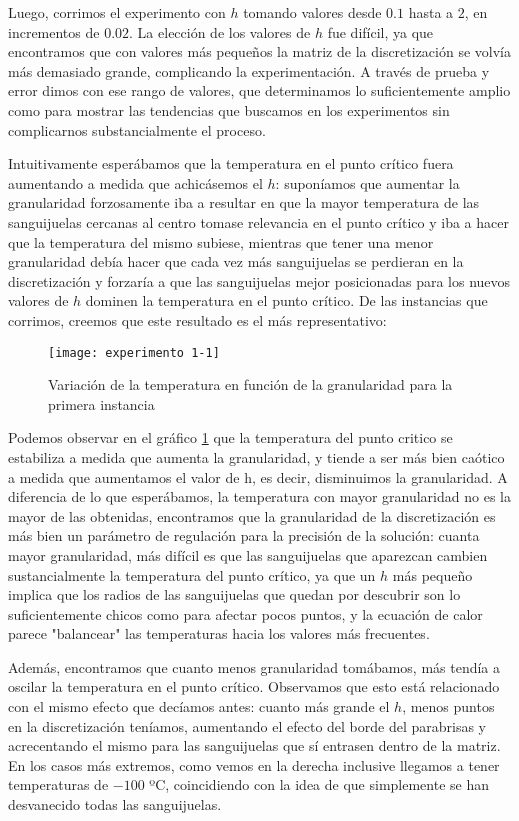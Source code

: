 Luego, corrimos el experimento con $h$ tomando valores desde $0.1$ hasta a $2$, en incrementos de $0.02$. La elección de los valores de $h$ fue difícil, ya que encontramos que con valores más pequeños la matriz de la discretización se volvía más demasiado grande, complicando la experimentación. A través de prueba y error dimos con ese rango de valores, que determinamos lo suficientemente amplio como para mostrar las tendencias que buscamos en los experimentos sin complicarnos substancialmente el proceso.

Intuitivamente esperábamos que la temperatura en el punto crítico fuera aumentando a medida que achicásemos el $h$: suponíamos que aumentar la granularidad forzosamente iba a resultar en que la mayor temperatura de las sanguijuelas cercanas al centro tomase relevancia en el punto crítico y iba a hacer que la temperatura del mismo subiese, mientras que tener una menor granularidad debía hacer que cada vez más sanguijuelas se perdieran en la discretización y forzaría a que las sanguijuelas mejor posicionadas para los nuevos valores de $h$ dominen la temperatura en el punto crítico. De las instancias que corrimos, creemos que este resultado es el más representativo:

\begin{figure}[h]
    \centering
    \texttt{[image: experimento 1-1]}
    \caption{Variación de la temperatura en función de la granularidad para la primera instancia}
    \label{fig:exp11}
\end{figure}

Podemos observar en el gráfico \ref{fig:exp11} que la temperatura del punto critico se estabiliza a medida que aumenta la granularidad, y tiende a ser más bien caótico a medida que aumentamos el valor de h, es decir, disminuimos la granularidad. A diferencia de lo que esperábamos, la temperatura con mayor granularidad no es la mayor de las obtenidas, encontramos que la granularidad de la discretización es más bien un parámetro de regulación para la precisión de la solución: cuanta mayor granularidad, más difícil es que las sanguijuelas que aparezcan cambien sustancialmente la temperatura del punto crítico, ya que un $h$ más pequeño implica que los radios de las sanguijuelas que quedan por descubrir son lo suficientemente chicos como para afectar pocos puntos, y la ecuación de calor parece "balancear" las temperaturas hacia los valores más frecuentes.

Además, encontramos que cuanto menos granularidad tomábamos, más tendía a oscilar la temperatura en el punto crítico. Observamos que esto está relacionado con el mismo efecto que decíamos antes: cuanto más grande el $h$, menos puntos en la discretización teníamos, aumentando el efecto del borde del parabrisas y acrecentando el mismo para las sanguijuelas que sí entrasen dentro de la matriz. En los casos más extremos, como vemos en la derecha inclusive llegamos a tener temperaturas de $-100$ ºC, coincidiendo con la idea de que simplemente se han desvanecido todas las sanguijuelas.

